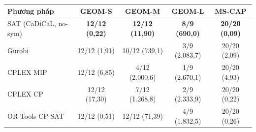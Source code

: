 \begin{tabular}{lcccc}
\toprule
Phương pháp & GEOM-S & GEOM-M & GEOM-L & MS-CAP \\
\midrule
SAT (CaDiCaL, no-sym) & \textbf{12/12 (0,22)} & \textbf{12/12 (11,90)} & \textbf{8/9 (690,0)} & \textbf{20/20 (0,09)} \\
Gurobi & 12/12 (1,91) & 10/12 (739,1) & 3/9 (2.083,7) & 20/20 (2,09) \\
CPLEX MIP & 12/12 (6,85) & 4/12 (2.000,6) & 1/9 (2.670,1) & 20/20 (4,93) \\
CPLEX CP & 12/12 (17,30) & 7/12 (1.268,8) & 2/9 (2.333,9) & 20/20 (0,22) \\
OR-Tools CP-SAT & 12/12 (0,51) & 12/12 (71,39) & 4/9 (1.832,5) & 20/20 (0,26) \\
\bottomrule
\end{tabular}
